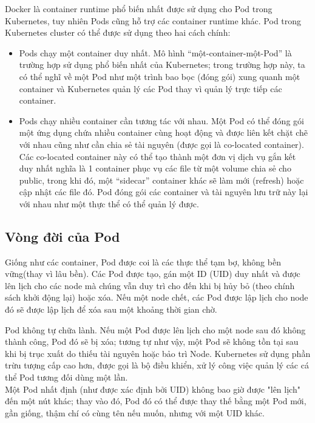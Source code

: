 \documentclass[14pt,a4paper]{report}
\begin{document}
	\hspace{0.3cm}Docker là container runtime phổ biến nhất được sử dụng cho Pod trong Kubernetes, tuy nhiên Pods cũng hỗ trợ các container runtime khác. Pod trong Kubernetes cluster có thể được sử dụng theo hai cách chính:\\
	\begin{itemize}				
		\item Pods chạy một container duy nhất. Mô hình “một-container-một-Pod” là trường hợp sử dụng phổ biến nhất của Kubernetes; trong trường hợp này, ta có thể nghĩ về một Pod như một trình bao bọc (đóng gói) xung quanh một container và Kubernetes quản lý các Pod thay vì quản lý trực tiếp các container.
		\item Pods chạy nhiều container cần tương tác với nhau. Một Pod có thể đóng gói một ứng dụng chứa nhiều container cùng hoạt động và được liên kết chặt chẽ với nhau cũng như cần chia sẻ tài nguyên (được gọi là co-located container). Các co-located container này có thể tạo thành một đơn vị dịch vụ gắn kết duy nhất nghĩa là 1 container phục vụ các file từ một volume chia sẻ cho public, trong khi đó, một “sidecar” container khác sẽ làm mới (refresh) hoặc cập nhật các file đó. Pod đóng gói các container và tài nguyên lưu trữ này lại với nhau như một thực thể có thể quản lý được.
	\end{itemize}
	\subsection{Vòng đời của Pod}
	{\hspace{1cm}Giống như các container, Pod được coi là các thực thể tạm bợ, không bền vững(thay vì lâu bền). Các Pod được tạo, gán một ID (UID) duy nhất và được lên lịch cho các node mà chúng vẫn duy trì cho đến khi bị hủy bỏ (theo chính sách khởi động lại) hoặc xóa. Nếu một node chết, các Pod được lập lịch cho node đó sẽ được lập lịch để xóa sau một khoảng thời gian chờ.\\}
	
	\hspace{0.3cm}Pod không tự chữa lành. Nếu một Pod được lên lịch cho một node sau đó không thành công, Pod đó sẽ bị xóa; tương tự như vậy, một Pod sẽ không tồn tại sau khi bị trục xuất do thiếu tài nguyên hoặc bảo trì Node. Kubernetes sử dụng phần trừu tượng cấp cao hơn, được gọi là bộ điều khiển, xử lý công việc quản lý các cá thể Pod tương đối dùng một lần.\\
	
	\hspace{0.3cm}Một Pod nhất định (như được xác định bởi UID) không bao giờ được "lên lịch" đến một nút khác; thay vào đó, Pod đó có thể được thay thế bằng một Pod mới, gần giống, thậm chí có cùng tên nếu muốn, nhưng với một UID khác.\\
	
\end{document}
